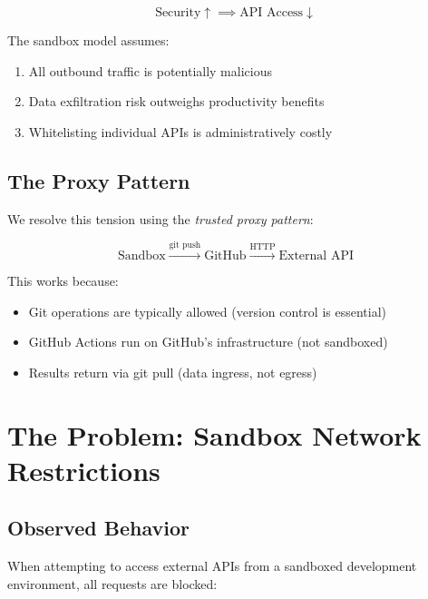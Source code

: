 \begin{equation}
\text{Security} \uparrow \implies \text{API Access} \downarrow
\end{equation}

The sandbox model assumes:
\begin{enumerate}
    \item All outbound traffic is potentially malicious
    \item Data exfiltration risk outweighs productivity benefits
    \item Whitelisting individual APIs is administratively costly
\end{enumerate}

\subsection{The Proxy Pattern}

We resolve this tension using the \emph{trusted proxy pattern}:

\begin{equation}
\text{Sandbox} \xrightarrow{\text{git push}} \text{GitHub} \xrightarrow{\text{HTTP}} \text{External API}
\end{equation}

This works because:
\begin{itemize}
    \item Git operations are typically allowed (version control is essential)
    \item GitHub Actions run on GitHub's infrastructure (not sandboxed)
    \item Results return via git pull (data ingress, not egress)
\end{itemize}

\section{The Problem: Sandbox Network Restrictions}
\label{sec:api-problem}

\subsection{Observed Behavior}

When attempting to access external APIs from a sandboxed development environment, all requests are blocked:

